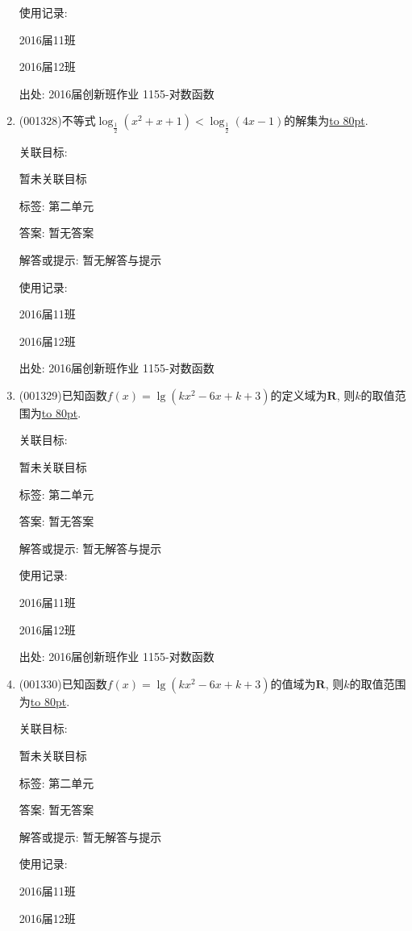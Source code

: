 \documentclass[10pt,a4paper]{article}
\newcommand{\blank}[1]{\underline{\hbox to #1pt{}}}
\begin{document}
\begin{enumerate}[1.]
使用记录:

2016届11班	

2016届12班	


出处: 2016届创新班作业	1155-对数函数
\item { (001328)}不等式$\log_{\frac{1}{2}}(x^2+x+1)<\log_{\frac{1}{2}}(4x-1)$的解集为\blank{80}.


关联目标:

暂未关联目标



标签: 第二单元

答案: 暂无答案

解答或提示: 暂无解答与提示

使用记录:

2016届11班	

2016届12班	


出处: 2016届创新班作业	1155-对数函数
\item { (001329)}已知函数$f(x)=\lg(kx^2-6x+k+3)$的定义域为$\mathbf{R}$, 则$k$的取值范围为\blank{80}.


关联目标:

暂未关联目标



标签: 第二单元

答案: 暂无答案

解答或提示: 暂无解答与提示

使用记录:

2016届11班	

2016届12班	


出处: 2016届创新班作业	1155-对数函数
\item { (001330)}已知函数$f(x)=\lg(kx^2-6x+k+3)$的值域为$\mathbf{R}$, 则$k$的取值范围为\blank{80}.


关联目标:

暂未关联目标



标签: 第二单元

答案: 暂无答案

解答或提示: 暂无解答与提示

使用记录:

2016届11班	

2016届12班	



\end{enumerate}
\end{document}
